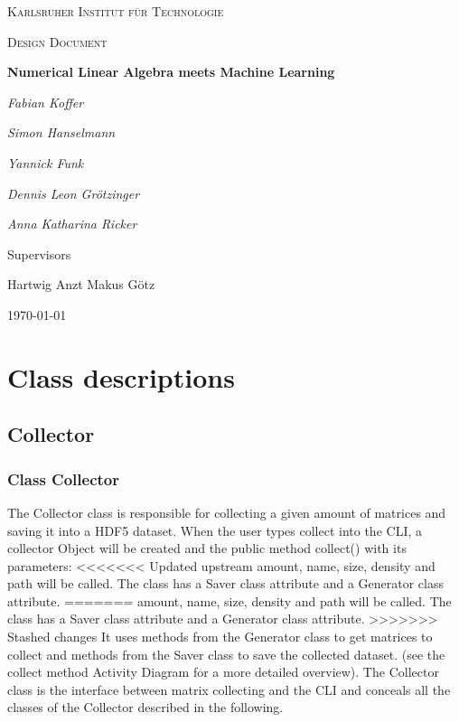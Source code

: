 \documentclass[parskip=full]{scrartcl}
\begin{document}
\begin{titlepage}
\centering
{\scshape\LARGE Karlsruher Institut für Technologie\par}
\vspace{1cm}
{\scshape\Large Design Document\par}
\vspace{1.5cm}
{\huge\bfseries Numerical Linear Algebra meets Machine Learning \par}
\vspace {2cm}

{\Large\itshape Fabian Koffer\par}
{\Large\itshape Simon Hanselmann\par}
{\Large\itshape Yannick Funk\par}
{\Large\itshape Dennis Leon Gr\"{o}tzinger\par}
{\Large\itshape Anna Katharina Ricker\par}

\vfill
Supervisors\par
Hartwig Anzt
Makus G\"{o}tz

\vfill
{\large\today\par}
\end{titlepage}

\tableofcontents
\newpage


\section{Class descriptions}

\subsection{Collector}
\subsubsection{Class Collector}
The Collector class is responsible for collecting a given amount of matrices and saving it into a HDF5 dataset.
When the user types collect into the CLI, a collector Object will be created and the public method collect() with its parameters:
<<<<<<< Updated upstream
amount, name, size, density and path will be called. The class has a Saver class attribute and a Generator class attribute.
=======
amount, name, size, density and path will be called. The class has a Saver class attribute and a Generator class attribute. 
>>>>>>> Stashed changes
It uses methods from the Generator class to get matrices to collect and methods from the Saver class to save the collected dataset.
(see the collect method Activity Diagram for a more detailed overview).
The Collector class is the interface between matrix collecting and the CLI and conceals all the classes of the Collector described in the following.
\end{document}
